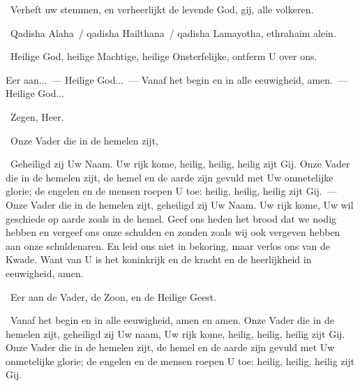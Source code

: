 \documentclass[12pt,twoside,a5paper]{article}
\begin{document}
\dd~Verheft uw stemmen, en verheerlijkt de levende God, gij, alle volkeren.
\vspace{0.5em}

\begin{doublecols}
  \textsizexi

  \dutchl \rr~Qadisha Alaha~/ qadisha Hailthana~/ qadisha Lamayotha, ethrahaim alein.

   \rr~Heilige God, heilige Machtige, heilige Onsterfelijke, ontferm U over ons.
\end{doublecols}

\begin{halfparskip}
  Eer aan...~--- Heilige God...~--- Vanaf het begin en in alle eeuwigheid, amen.~--- Heilige God...

  \dd~Zegen, Heer.

  \cc~Onze Vader die in de hemelen zijt,

  \rr~Geheiligd zij Uw Naam. Uw rijk kome, heilig, heilig, heilig zijt Gij. Onze Vader die in de hemelen zijt, de hemel en de aarde zijn gevuld met Uw onmetelijke glorie; de engelen en de mensen roepen U toe: heilig, heilig, heilig zijt Gij.~--- Onze Vader die in de hemelen zijt, geheiligd zij Uw Naam. Uw rijk kome, Uw wil geschiede op aarde zoals in de hemel. Geef ons heden het brood dat we nodig hebben en vergeef ons onze schulden en zonden zoals wij ook vergeven hebben aan onze schuldenaren. En leid ons niet in bekoring, maar verlos ons van de Kwade. Want van U is het koninkrijk en de kracht en de heerlijkheid in eeuwigheid, amen.

  \cc~Eer aan de Vader, de Zoon, en de Heilige Geest.

  \rr~Vanaf het begin en in alle eeuwigheid, amen en amen. Onze Vader die in de hemelen zijt, geheiligd zij Uw naam, Uw rijk kome, heilig, heilig, heilig zijt Gij. Onze Vader die in de hemelen zijt, de hemel en de aarde zijn gevuld met Uw onmetelijke glorie; de engelen en de mensen roepen U toe: heilig, heilig, heilig zijt Gij.

\end{halfparskip}
\end{document}
